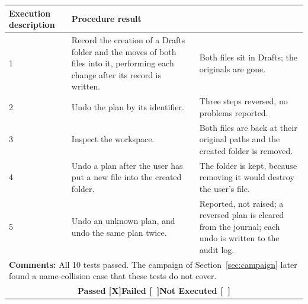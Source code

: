 \documentclass{FastFyp}
\begin{document}
{\begin{longtable}{|p{2.4cm}p{5.0cm}p{2.4cm}p{3.8cm}|}
  \multicolumn{1}{p{5.0cm}|}{\textbf{Execution description}} &
  \multicolumn{2}{p{6.6cm}|}{\textbf{Procedure result}} \\ \hline
\multicolumn{1}{|p{2.4cm}|}{1} & \multicolumn{1}{p{5.0cm}|}{Record the creation of a Drafts folder and the moves of both files into it, performing each change after its record is written.} & \multicolumn{2}{p{6.6cm}|}{Both files sit in Drafts; the originals are gone.} \\ \hline
\multicolumn{1}{|p{2.4cm}|}{2} & \multicolumn{1}{p{5.0cm}|}{Undo the plan by its identifier.} & \multicolumn{2}{p{6.6cm}|}{Three steps reversed, no problems reported.} \\ \hline
\multicolumn{1}{|p{2.4cm}|}{3} & \multicolumn{1}{p{5.0cm}|}{Inspect the workspace.} & \multicolumn{2}{p{6.6cm}|}{Both files are back at their original paths and the created folder is removed.} \\ \hline
\multicolumn{1}{|p{2.4cm}|}{4} & \multicolumn{1}{p{5.0cm}|}{Undo a plan after the user has put a new file into the created folder.} & \multicolumn{2}{p{6.6cm}|}{The folder is kept, because removing it would destroy the user's file.} \\ \hline
\multicolumn{1}{|p{2.4cm}|}{5} & \multicolumn{1}{p{5.0cm}|}{Undo an unknown plan, and undo the same plan twice.} & \multicolumn{2}{p{6.6cm}|}{Reported, not raised; a reversed plan is cleared from the journal; each undo is written to the audit log.} \\ \hline
\multicolumn{4}{|p{14.8cm}|}{\textbf{Comments:} All 10 tests passed. The campaign of Section~\ref{sec:campaign} later found a name-collision case that these tests do not cover.} \\ \hline
\multicolumn{4}{|c|}{\textbf{Passed [X]\quad Failed [\ ]\quad Not Executed [\ ]}} \\ \hline
\end{longtable}
}
\end{document}
